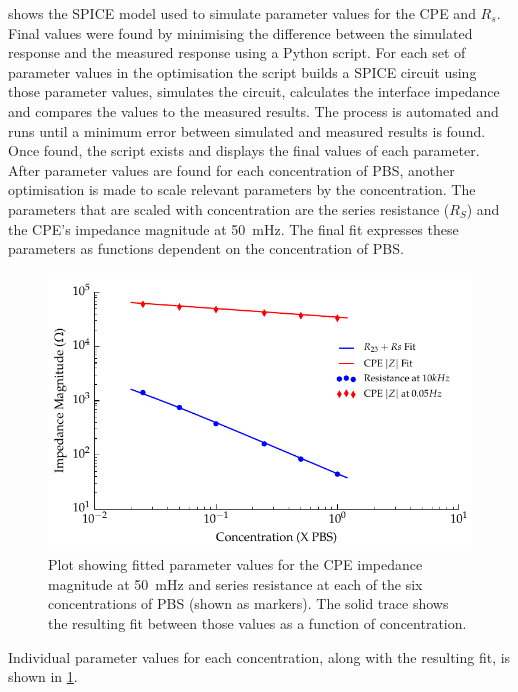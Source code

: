        shows the SPICE model used to simulate parameter values for the CPE and $R_{s}$.
      Final values were found by minimising the difference between the simulated response and the measured response using a Python script.
      For each set of parameter values in the optimisation the script builds a SPICE circuit using those parameter values, simulates the circuit, calculates the interface impedance and compares the values to the measured results.
      The process is automated and runs until a minimum error between simulated and measured results is found.
      Once found, the script exists and displays the final values of each parameter.
      After parameter values are found for each concentration of PBS, another optimisation is made to scale relevant parameters by the concentration.
      The parameters that are scaled with concentration are the series resistance ($R_{S}$) and the CPE's impedance magnitude at \SI{50}{\milli\hertz}.
      The final fit expresses these parameters as functions dependent on the concentration of PBS.
      \begin{figure}
        \centering
        \includegraphics{content/pt2/08-InterfaceParameters/graphics/scalingFactors_Displacement_Thesis}
        \caption{\label{fig:pt2-scalingFactors_Displacement_Thesis}Plot showing fitted parameter values for the CPE impedance magnitude at \SI{50}{\milli\hertz} and series resistance at each of the six concentrations of PBS (shown as markers). The solid trace shows the resulting fit between those values as a function of concentration.}
      \end{figure}
      Individual parameter values for each concentration, along with the resulting fit, is shown in \cref{fig:pt2-scalingFactors_Displacement_Thesis}.
